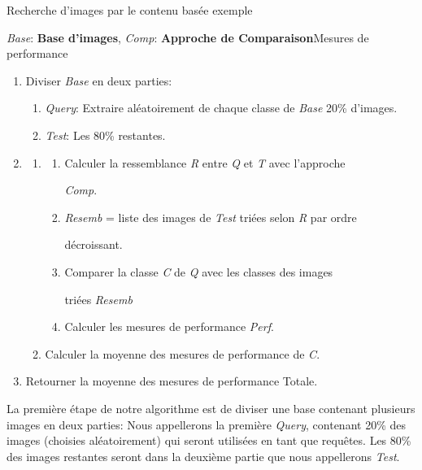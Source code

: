 \begin{algorithme}[H]
\caption{Recherche d'images par le contenu basée exemple}
{\textit{Base}: \textbf{Base d'images}, \textit{Comp}: \textbf{Approche de Comparaison}}{Mesures de performance}
{
\begin{enumerate}


\item Diviser \textit{Base} en deux parties:
\begin{enumerate}[a]
\item \textit{Query}: Extraire aléatoirement de chaque classe de \textit{Base} 20\% d'images.
\item \textit{Test}: Les 80\% restantes.
\end{enumerate}

\item {}
{
\begin{enumerate}
\item {}
{
	\begin{enumerate}[a]
	\item {}
	{
		Calculer la ressemblance \textit{R} entre \textit{Q} et \textit{T} avec l'approche 
		
		\textit{Comp}.
	}
	\item \textit{Resemb} = liste des images de \textit{Test} triées selon \textit{R} par ordre 
	
	
	décroissant.
	\item Comparer la classe \textit{C} de \textit{Q} avec les classes des images 
	
	triées \textit{Resemb}
	\item Calculer les mesures de performance \textit{Perf}.
	\end{enumerate}
}
\item Calculer la moyenne des mesures de performance de \textit{C}.
\end{enumerate}
}
\item Retourner la moyenne des mesures de performance Totale.
\end{enumerate}
}
\end{algorithme}

	La première étape de notre algorithme est de diviser une base contenant plusieurs images en deux parties: Nous appellerons la première \textit{Query}, contenant 20\% des images (choisies aléatoirement) qui seront utilisées en tant que requêtes. Les 80\% des images restantes seront dans la deuxième partie que nous appellerons \textit{Test}.

